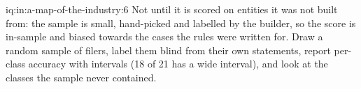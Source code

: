 \begin{solution}{iq:in:a-map-of-the-industry:6}
Not until it is scored on entities it was not built from: the sample is small, hand-picked and labelled by the builder,
so the score is in-sample and biased towards the cases the rules were written for. Draw a random sample of filers, label
them blind from their own statements, report per-class accuracy with intervals (18 of 21 has a wide interval), and look
at the classes the sample never contained.
\end{solution}
